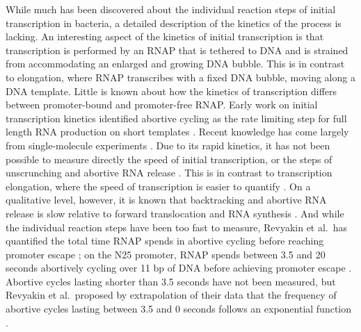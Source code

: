 While much has been discovered about the individual reaction steps of initial
transcription in bacteria, a detailed description of the kinetics of the
process is lacking. An interesting aspect of the kinetics of initial
transcription is that transcription is performed by an RNAP that is tethered to
DNA and is strained from accommodating an enlarged and growing DNA bubble.
This is in contrast to elongation, where RNAP transcribes with a fixed DNA
bubble, moving along a DNA template. Little is known about how the kinetics of
transcription differs between promoter-bound and promoter-free RNAP. Early
work on initial transcription kinetics identified abortive cycling as the rate
limiting step for full length RNA production on short templates
\cite{stefano_lac_1979, munson_abortive_1981}. Recent knowledge has come
largely from single-molecule experiments \cite{revyakin_abortive_2006,
kapanidis_initial_2006, tang_real-time_2009, kapanidis_retention_2005,
margeat_direct_2006}. Due to its rapid kinetics, it has not been possible to
measure directly the speed of initial transcription, or the steps of
unscrunching and abortive RNA release \cite{revyakin_abortive_2006,
margeat_direct_2006}. This is in contrast to transcription elongation, where
the speed of transcription is easier to quantify \cite{wang_force_1998,
tolic-norrelykke_diversity_2004, bai_mechanochemical_2007}. On a qualitative
level, however, it is known that backtracking and abortive RNA release is slow
relative to forward translocation and RNA synthesis
\cite{revyakin_abortive_2006, margeat_direct_2006}. And while the individual
reaction steps have been too fast to measure, Revyakin et al.\ has quantified
the total time RNAP spends in abortive cycling before reaching promoter escape
\cite{revyakin_abortive_2006}; on the N25 promoter, RNAP spends between 3.5
and 20 seconds abortively cycling over 11 bp of DNA before achieving promoter
escape \cite{revyakin_abortive_2006}. Abortive cycles lasting shorter than 3.5
seconds have not been measured, but Revyakin et al.\ proposed by extrapolation
of their data that the frequency of abortive cycles lasting between 3.5 and 0
seconds follows an exponential function \cite{revyakin_abortive_2006}.  

